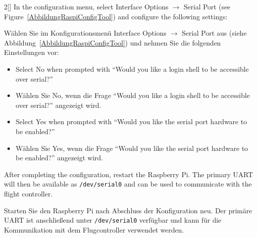\begin{paracol}{2}[]
In the configuration menu, select Interface Options \(\rightarrow\) Serial Port (see Figure~\ref{AbbildungRaspiConfigTool}) and configure the following settings:

\colger

Wählen Sie im Konfigurationsmenü Interface Options \(\rightarrow\) Serial Port aus (siehe Abbildung~\ref{AbbildungRaspiConfigTool}) und nehmen Sie die folgenden Einstellungen vor:

\coleng

\begin{itemize}
  \item Select No when prompted with ``Would you like a login shell to be accessible over serial?''
\end{itemize}

\colger

\begin{itemize}
  \item Wählen Sie No, wenn die Frage ``Would you like a login shell to be accessible over serial?'' angezeigt wird.
\end{itemize}

\coleng

\begin{itemize}
  \item Select Yes when prompted with ``Would you like the serial port hardware to be enabled?''
\end{itemize}

\colger

\begin{itemize}
  \item Wählen Sie Yes, wenn die Frage ``Would you like the serial port hardware to be enabled?'' angezeigt wird.
\end{itemize}

\coleng

After completing the configuration, restart the Raspberry Pi. The primary UART will then be available as \verb!/dev/serial0! and can be used to communicate with the flight controller.

\colger

Starten Sie den Raspberry Pi nach Abschluss der Konfiguration neu. Der primäre UART ist anschließend unter \verb!/dev/serial0! verfügbar und kann für die Kommunikation mit dem Flugcontroller verwendet werden.

\colende

\renewcommand{\deutschertitel}{Sicherheitshinweise vor den Flugtests}
\renewcommand{\englischertitel}{Safety Considerations Before Flight Testing}
\makrounterabschnitt


\end{paracol}
